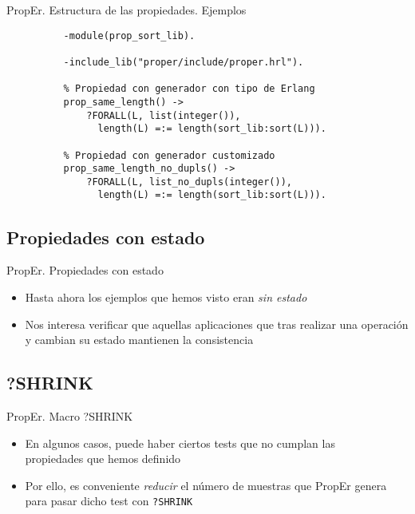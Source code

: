 \documentclass{beamer}
\begin{document}
      \begin{frame}[fragile]{PropEr. Estructura de las propiedades. Ejemplos}
        \begin{verbatim}
          -module(prop_sort_lib).

          -include_lib("proper/include/proper.hrl").

          % Propiedad con generador con tipo de Erlang
          prop_same_length() ->
              ?FORALL(L, list(integer()),
                length(L) =:= length(sort_lib:sort(L))).

          % Propiedad con generador customizado
          prop_same_length_no_dupls() ->
              ?FORALL(L, list_no_dupls(integer()),
                length(L) =:= length(sort_lib:sort(L))).
        \end{verbatim}
      \end{frame}

    \subsection{Propiedades con estado}
      \begin{frame}{PropEr. Propiedades con estado}
        \begin{itemize}
          \item Hasta ahora los ejemplos que hemos visto eran \textit{sin estado}
          \item Nos interesa verificar que aquellas aplicaciones que tras realizar
          una operación y cambian su estado mantienen la consistencia
        \end{itemize}

      \end{frame}
    \subsection{?SHRINK}
      \begin{frame}{PropEr. Macro ?SHRINK}
        \begin{itemize}
          \item En algunos casos, puede haber ciertos tests que no cumplan las\\
          propiedades que hemos definido
          \item Por ello, es conveniente \textit{reducir} el número de muestras
          que PropEr genera para pasar dicho test con \texttt{?SHRINK}
        \end{itemize}
      \end{frame}
\end{document}
